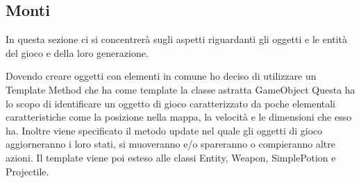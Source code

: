 \documentclass[a4paper,12pt]{report}
\begin{document}
    \subsection{Monti}
    \par In questa sezione ci si concentrerà sugli aspetti riguardanti gli oggetti e le entità del gioco e della loro generazione.
    \par Dovendo creare oggetti con elementi in comune ho deciso di utilizzare un Template Method che ha come template la classe astratta GameObject
    Questa ha lo scopo di identificare un oggetto di gioco caratterizzato da poche elementali caratteristiche come la posizione nella mappa, la velocità e
    le dimensioni che esso ha.
    Inoltre viene specificato il metodo update nel quale gli oggetti di gioco aggiorneranno i loro stati, si muoveranno e/o spareranno o compieranno
    altre azioni.
    Il template viene poi esteso alle classi Entity, Weapon, SimplePotion e Projectile.
    \\
    \par
\end{document}
